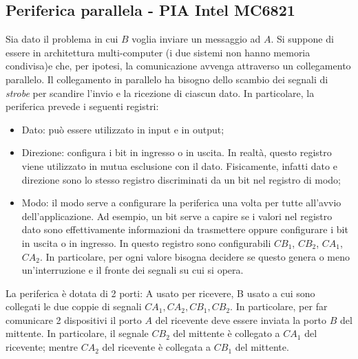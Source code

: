 \documentclass{article}
\begin{document}
\subsection{Periferica parallela - PIA Intel MC6821}
Sia dato il problema in cui $B$ voglia inviare un messaggio ad $A$. Si 
suppone di essere in architettura multi-computer (i due sistemi non hanno 
memoria condivisa)e che, per ipotesi, la comunicazione avvenga attraverso un collegamento  parallelo. Il collegamento in parallelo ha bisogno dello scambio  dei segnali di \textit{strobe} per scandire l'invio e la ricezione di ciascun dato. In particolare, la periferica  prevede i seguenti registri:

\begin{itemize}
  \item Dato: può essere utilizzato in input e in output;
  \item Direzione: configura i bit in ingresso o in uscita. In realtà, questo 
    registro viene utilizzato in mutua esclusione con il dato. Fisicamente, 
    infatti dato e direzione sono lo stesso registro discriminati da un bit 
    nel registro di modo;
  \item Modo: il modo serve a configurare la periferica una volta per tutte 
    all'avvio dell'applicazione. Ad esempio, un bit serve a capire se i valori 
    nel registro dato sono effettivamente informazioni da trasmettere oppure 
    configurare i bit in uscita o in ingresso. In questo registro sono
    configurabili $CB_1$, $CB_2$, $CA_1$, $CA_2$. In particolare, per ogni 
    valore bisogna decidere se questo genera o meno un'interruzione e il fronte 
    dei segnali su cui si opera.
\end{itemize}

La periferica è dotata di 2 porti: A usato per ricevere, B usato a cui sono collegati le due coppie di segnali $CA_1, CA_2, CB_1, CB_2$. In particolare, per far comunicare 2 dispositivi il porto $A$ del ricevente deve essere inviata la porto $B$ del mittente. In particolare, il segnale $CB_2$ del mittente è collegato a $CA_1$ del ricevente; mentre $CA_2$ del ricevente è collegata a $CB_1$ del mittente. 
\end{document}
